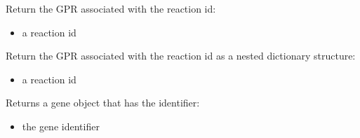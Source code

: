 \documentclass[letterpaper,10pt,english]{sphinxmanual}
\begin{document}
\begin{fulllineitems}
\begin{fulllineitems}
\begin{itemize}
\end{itemize}

\end{fulllineitems}


\begin{fulllineitems}
\label{\detokenize{modules_doc:cbmpy.CBModel.Model.getGPRforReaction}}
\pysigstartsignatures
{}
\pysigstopsignatures
\sphinxAtStartPar
Return the GPR associated with the reaction id:
\begin{itemize}
\item {} 
\sphinxAtStartPar
{} a reaction id

\end{itemize}

\end{fulllineitems}


\begin{fulllineitems}
\label{\detokenize{modules_doc:cbmpy.CBModel.Model.getGPRforReactionAsDict}}
\pysigstartsignatures
{}
\pysigstopsignatures
\sphinxAtStartPar
Return the GPR associated with the reaction id as a nested dictionary structure:
\begin{itemize}
\item {} 
\sphinxAtStartPar
{} a reaction id

\end{itemize}

\end{fulllineitems}


\begin{fulllineitems}
\label{\detokenize{modules_doc:cbmpy.CBModel.Model.getGene}}
\pysigstartsignatures
{}
\pysigstopsignatures
\sphinxAtStartPar
Returns a gene object that has the identifier:
\begin{itemize}
\item {} 
\sphinxAtStartPar
{} the gene identifier


\end{itemize}
\end{fulllineitems}
\end{fulllineitems}
\end{document}
